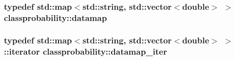 \subsubsection[{\texorpdfstring{datamap}{datamap}}]{\setlength{\rightskip}{0pt plus 5cm}typedef std\+::map$<$std\+::string, std\+::vector$<$double$>$ $>$ {\bf classprobability\+::datamap}}\hypertarget{namespaceclassprobability_a7c13c52cf87895179c1b746d4c8f4c77}{}\label{namespaceclassprobability_a7c13c52cf87895179c1b746d4c8f4c77}
\subsubsection[{\texorpdfstring{datamap\+\_\+iter}{datamap_iter}}]{\setlength{\rightskip}{0pt plus 5cm}typedef std\+::map$<$std\+::string, std\+::vector$<$double$>$ $>$\+::iterator {\bf classprobability\+::datamap\+\_\+iter}}\hypertarget{namespaceclassprobability_a0994aaee5966a00202024265c4adc3c5}{}\label{namespaceclassprobability_a0994aaee5966a00202024265c4adc3c5}
